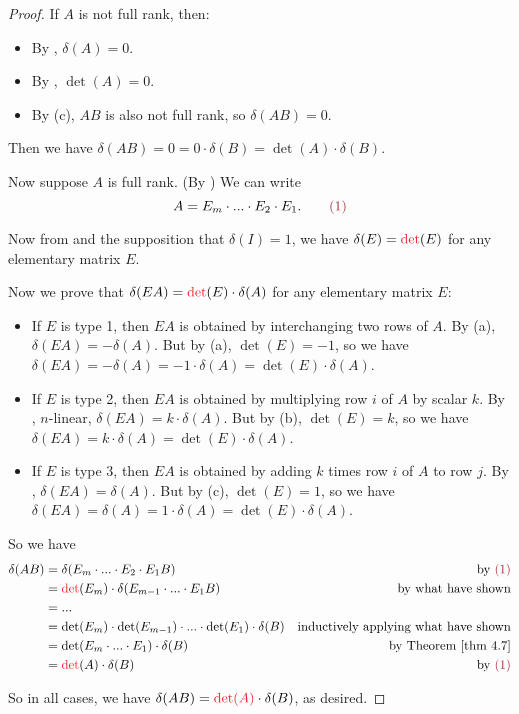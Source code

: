 \begin{proof}
If \(A\) is not full rank, then:
\begin{itemize}
\item By , \(\delta(A) = 0\).
\item By , \(\det(A) = 0\).
\item By (c), \(AB\) is also not full rank, so \(\delta(AB) = 0\).
\end{itemize}
Then we have \(\delta(AB) = 0 = 0 \cdot \delta(B) = \det(A) \cdot \delta(B)\).


Now suppose \(A\) is full rank.
(By ) We can write
\[
    A = E_m \cdot ... \cdot E_2 \cdot E_1. \quad \quad \MAROON{(1)}
\]

Now from  and the supposition that \(\delta(I) = 1\), we have \(\delta(E) = \RED{\det}(E)\) for any elementary matrix \(E\).

Now we prove that \(\delta(EA) = \RED{\det}(E) \cdot \delta(A)\) for any elementary matrix \(E\):
\begin{itemize}
\item If \(E\) is type 1, then \(EA\) is obtained by interchanging two rows of \(A\).
By (a), \(\delta(EA) = -\delta(A)\).
But by (a), \(\det(E) = -1\), so we have \(\delta(EA) = -\delta(A) = -1 \cdot \delta(A) = \det(E) \cdot \delta(A)\).

\item If \(E\) is type 2, then \(EA\) is obtained by multiplying row \(i\) of \(A\) by scalar \(k\).
By , \(n\)-linear, \(\delta(EA) = k \cdot \delta(A)\).
But by (b), \(\det(E) = k\), so we have \(\delta(EA) = k \cdot \delta(A) = \det(E) \cdot \delta(A)\).

\item If \(E\) is type 3, then \(EA\) is obtained by adding \(k\) times row \(i\) of \(A\) to row \(j\).
By , \(\delta(EA) = \delta(A)\).
But by (c), \(\det(E) = 1\), so we have \(\delta(EA) = \delta(A) = 1 \cdot \delta(A) = \det(E) \cdot \delta(A)\).
\end{itemize}

So we have
\begin{align*}
    \delta(AB) & = \delta(E_m \cdot ... \cdot E_2 \cdot E_1 B) & \text{by \MAROON{(1)}} \\
               & = \RED{\det}(E_m) \cdot \delta(E_{m - 1} \cdot ... \cdot E_1 B) & \text{by what have shown} \\
               & = ... \\
               & = \det(E_m) \cdot \det(E_{m - 1}) \cdot ... \cdot \det(E_1) \cdot \delta(B) & \text{inductively applying what have shown} \\
               & = \det(E_m \cdot ... \cdot E_1) \cdot \delta(B) & \text{by \THM{4.7}} \\
               & = \RED{\det}(A) \cdot \delta(B) & \text{by \MAROON{(1)}}
\end{align*}

So in all cases, we have \(\delta(AB) = \RED{\det(A)} \cdot \delta(B)\), as desired.
\end{proof}

